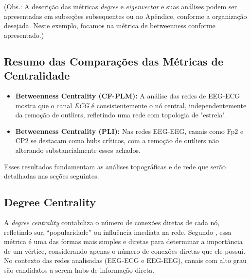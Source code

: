 (Obs.: A descrição das métricas \emph{degree} e \emph{eigenvector} e suas análises podem ser apresentadas em subseções subsequentes ou no Apêndice, conforme a organização desejada. Neste exemplo, focamos na métrica de betweenness conforme apresentado.)

\subsection{Resumo das Comparações das Métricas de Centralidade}

\begin{itemize}
    \item \textbf{Betweenness Centrality (CF-PLM):} A análise das redes de EEG-ECG mostra que o canal \emph{ECG} é consistentemente o nó central, independentemente da remoção de outliers, refletindo uma rede com topologia de "estrela".
    \item \textbf{Betweenness Centrality (PLI):} Nas redes EEG-EEG, canais como Fp2 e CP2 se destacam como hubs críticos, com a remoção de outliers não alterando substancialmente esses achados.
\end{itemize}

Esses resultados fundamentam as análises topográficas e de rede que serão detalhadas nas seções seguintes.

\subsection{Degree Centrality}

A \emph{degree centrality} contabiliza o número de conexões diretas de cada nó, refletindo sua “popularidade” ou influência imediata na rede. Segundo \cite{newman2010networks}, essa métrica é uma das formas mais simples e diretas para determinar a importância de um vértice, considerando apenas o número de conexões diretas que ele possui. No contexto das redes analisadas (EEG-ECG e EEG-EEG), canais com alto grau são candidatos a serem hubs de informação direta.

